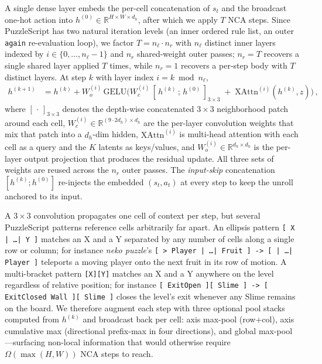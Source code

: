 A single dense layer embeds the per-cell concatenation of $s_t$ and the broadcast one-hot action into $h^{(0)} \in \mathbb{R}^{H \times W \times d_h}$, after which we apply $T$ NCA steps.
Since PuzzleScript has two natural iteration levels (an inner ordered rule list, an outer \texttt{again} re-evaluation loop), we factor $T = n_\ell \cdot n_r$ with $n_\ell$ distinct inner layers indexed by $i \in \{0,\dots,n_\ell{-}1\}$ and $n_r$ shared-weight outer passes; $n_r = T$ recovers a single shared layer applied $T$ times, while $n_r = 1$ recovers a per-step body with $T$ distinct layers.
At step $k$ with layer index $i = k \bmod n_\ell$,
\begin{align}
  h^{(k+1)} &= h^{(k)} + W^{(i)}_o \,\mathrm{GELU}\!\bigl(
      W^{(i)}_c \, [\, h^{(k)} \,;\, h^{(0)} \,]_{3\times 3}
      \;+\;
      \mathrm{XAttn}^{(i)}(h^{(k)}, z)
    \bigr) \, ,
\end{align}
where $[\,\cdot\,]_{3\times 3}$ denotes the depth-wise concatenated $3{\times}3$ neighborhood patch around each cell, $W^{(i)}_c \in \mathbb{R}^{(9 \cdot 2 d_h) \times d_h}$ are the per-layer convolution weights that mix that patch into a $d_h$-dim hidden, $\mathrm{XAttn}^{(i)}$ is multi-head attention with each cell as a query and the $K$ latents as keys/values, and $W^{(i)}_o \in \mathbb{R}^{d_h \times d_h}$ is the per-layer output projection that produces the residual update.
All three sets of weights are reused across the $n_r$ outer passes.
The \emph{input-skip} concatenation $[h^{(k)}; h^{(0)}]$ re-injects the embedded $(s_t, a_t)$ at every step to keep the unroll anchored to its input.

A $3{\times}3$ convolution propagates one cell of context per step, but several PuzzleScript patterns reference cells arbitrarily far apart.
An ellipsis pattern \texttt{[ X | \ldots | Y ]} matches an X and a Y separated by any number of cells along a single row or column; for instance \textit{neko puzzle}'s \texttt{[ > Player | \ldots | Fruit ] -> [ | \ldots | Player ]} teleports a moving player onto the next fruit in its row of motion.
A multi-bracket pattern \texttt{[X][Y]} matches an X and a Y anywhere on the level regardless of relative position; for instance \texttt{[ ExitOpen ][ Slime ] -> [ ExitClosed Wall ][ Slime ]} closes the level's exit whenever any Slime remains on the board.
We therefore augment each step with three optional pool stacks computed from $h^{(k)}$ and broadcast back per cell: axis max-pool (row+col), axis cumulative max (directional prefix-max in four directions), and global max-pool---surfacing non-local information that would otherwise require $\Omega(\max(H,W))$ NCA steps to reach.


